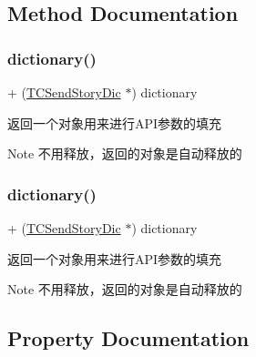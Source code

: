 \subsection{Method Documentation}
\mbox{\label{interface_t_c_send_story_dic_afaf8aea377547c5de261af7064c00b98}} 
\subsubsection{\texorpdfstring{dictionary()}{dictionary()}\hspace{0.1cm}{\footnotesize\ttfamily [1/2]}}
{\footnotesize\ttfamily + (\mbox{\hyperlink{interface_t_c_send_story_dic}{T\+C\+Send\+Story\+Dic}} $\ast$) dictionary \begin{DoxyParamCaption}{ }\end{DoxyParamCaption}}

返回一个对象用来进行\+A\+P\+I参数的填充

\begin{DoxyNote}{Note}
不用释放，返回的对象是自动释放的 
\end{DoxyNote}
\mbox{\label{interface_t_c_send_story_dic_afaf8aea377547c5de261af7064c00b98}} 
\subsubsection{\texorpdfstring{dictionary()}{dictionary()}\hspace{0.1cm}{\footnotesize\ttfamily [2/2]}}
{\footnotesize\ttfamily + (\mbox{\hyperlink{interface_t_c_send_story_dic}{T\+C\+Send\+Story\+Dic}} $\ast$) dictionary \begin{DoxyParamCaption}{ }\end{DoxyParamCaption}}

返回一个对象用来进行\+A\+P\+I参数的填充

\begin{DoxyNote}{Note}
不用释放，返回的对象是自动释放的 
\end{DoxyNote}


\subsection{Property Documentation}
\mbox{\label{interface_t_c_send_story_dic_a91fc1d35a7f4100ca5ca7e799e04d3d3}} 
